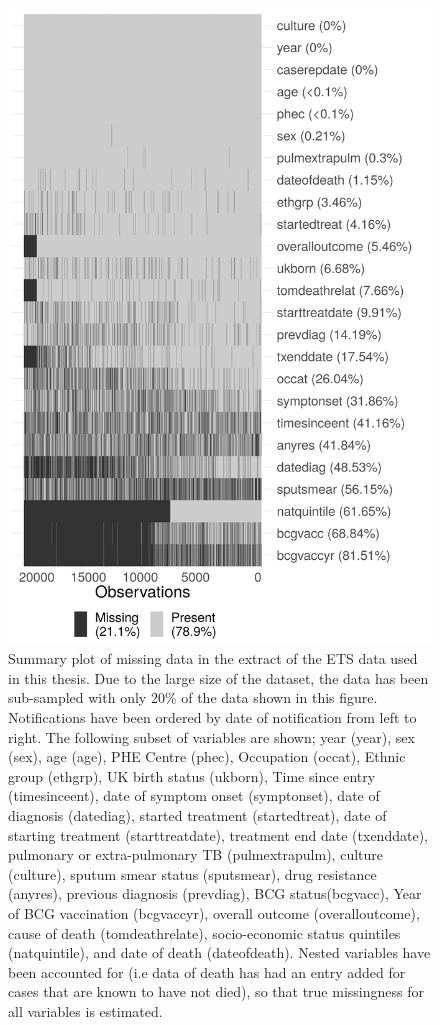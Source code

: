 \documentclass[11pt,twoside]{bristolthesis}
\begin{document}
  \begin{figure}
  
  {\centering \includegraphics[width=0.6\linewidth,]{chapters/tb-epi-england/figures/plot-missing-struct} 
  
  }
  
  \caption[Summary plot of missing data in the extract of the ETS data used in this thesis.]{Summary plot of missing data in the extract of the ETS data used in this thesis. Due to the large size of the dataset, the data has been sub-sampled with only 20\% of the data shown in this figure. Notifications have been ordered by date of notification from left to right. The following subset of variables are shown; year (year), sex (sex), age (age), PHE Centre (phec), Occupation (occat), Ethnic group (ethgrp), UK birth status (ukborn), Time since entry (timesinceent), date of symptom onset (symptonset), date of diagnosis (datediag), started treatment (startedtreat), date of starting treatment (starttreatdate), treatment end date (txenddate), pulmonary or extra-pulmonary TB (pulmextrapulm), culture (culture), sputum smear status (sputsmear), drug resistance (anyres), previous diagnosis (prevdiag), BCG status(bcgvacc), Year of BCG vaccination (bcgvaccyr), overall outcome (overalloutcome), cause of death (tomdeathrelate), socio-economic status quintiles (natquintile), and date of death (dateofdeath). Nested variables have been accounted for (i.e data of death has had an entry added for cases that are known to have not died), so that true missingness for all variables is estimated.}\label{fig:plot-missing-struct}
  \end{figure}
\end{document}
